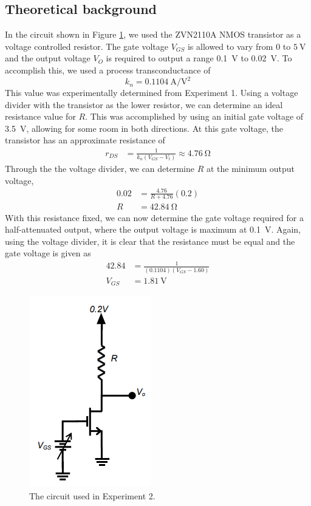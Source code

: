 \documentclass{report}
\begin{document}
\subsection{Theoretical background}
In the circuit shown in Figure \ref{fig:exp2ckt}, we used the ZVN2110A NMOS transistor as a voltage controlled resistor. The gate voltage $V_{GS}$ is allowed to vary from $0$ to $\SI{5}{\V}$ and the output voltage $V_O$ is required to output a range \SI{0.1}{\V} to \SI{0.02}{\V}.
To accomplish this, we used a process transconductance of \[k_n = \SI{0.1104}{\A\per\V\squared}\]
This value was experimentally determined from Experiment 1. Using a voltage divider with the transistor as the lower resistor, we can determine an ideal resistance value for $R$. This was accomplished by using an initial gate voltage of \SI{3.5}{\V}, allowing for some room in both directions. At this gate voltage, the transistor has an approximate resistance of
\begin{align*}
	r_{DS} & = \frac{1}{k_n \left( V_{GS} - V_t\right)} \approx \SI{4.76}{\ohm}
\end{align*}
Through the the voltage divider, we can determine $R$ at the minimum output voltage,
\begin{align*}
0.02 & = \frac{4.76}{R + 4.76} (0.2) \\
R & = \SI{42.84}{\ohm}
\end{align*}
With this resistance fixed, we can now determine the gate voltage required for a half-attenuated output, where the output voltage is maximum at \SI{0.1}{\V}. Again, using the voltage divider, it is clear that the resistance must be equal and the gate voltage is given as \begin{align*}
	42.84 & = \frac{1}{(0.1104)(V_{GS} - 1.60)} \\
	V_{GS} & = \SI{1.81}{\V}
\end{align*}
\begin{figure}[H]
	\centering
	\includegraphics[width=0.25\linewidth]{exp2ckt}
	\caption{The circuit used in Experiment 2.}
	\label{fig:exp2ckt}
\end{figure}
\end{document}
